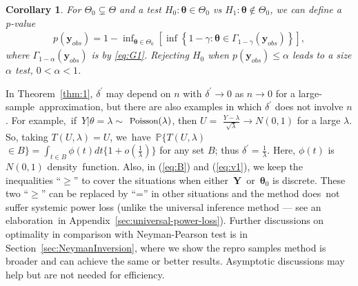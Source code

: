 \documentclass[12pt]{article}
\theoremstyle{shortspace}
\newtheorem{corollary}{Corollary}
\def\*#1{\bm{#1}}
\def\P{\mathbb P}
\begin{document}
\begin{corollary}\label{col:test}
For $\Theta_0 \subsetneq \Theta$ and 
a test $H_0: \*\theta \in \Theta_0$ vs $H_1: \*\theta \not\in \Theta_0$, we can define a p-value 
\begin{align*} 
p(\*y_{obs})=   1- \inf\nolimits_{\*\theta \in \Theta_0}\left[\inf\left\{{1- \gamma}: 
\*\theta \in \Gamma_{1 - \gamma}
(\*y_{obs})\right\}\right],
\end{align*}
where $\Gamma_{1-\alpha}(\*y_{obs})$ is by  \eqref{eq:G1}.
Rejecting $H_0$ when
$p(\*y_{obs}) \leq \alpha$ 
leads to a size $\alpha$ test, $0 < \alpha < 1$. 
\end{corollary}

In Theorem~\ref{thm:1},
 $\delta^{'}$ 
 may depend  on $n$ with $\delta^{'} \to 0$ as $n \to 0$ for a large-sample~approximation, but there are also examples in which $\delta^{'}$ does not involve $n$.
For example,~if~$Y | \theta  = \lambda \sim $ $  \text{\small Poisson}(\lambda)$, then 
$U =$ $ \frac{Y -  \lambda}{\sqrt{\lambda}}
\to N(0,1)$ for a large $\lambda$. So, 
taking $T(U, \lambda) = U$, we~have~$\P \{T(U,  \lambda) $ $ \in B \} =  \int_{{t} \in B}
\phi({t}) d {t} \{1 + o(\frac1\lambda)\}$ for any set $B$; thus $\delta^{'} = \frac1\lambda$. 
Here, 
 $\phi(t)$ is $N(0,1)$ density~function. Also, in (\ref{eq:B}) and (\ref{eq:v1}), 
we keep 
the inequalities ``$\geq$'' to cover the situations when either~$\*Y$~or~$\*\theta_0$ is discrete. These two ``$\geq$'' can be replaced by
 ``='' in other situations and the method does~not suffer systemic power loss (unlike the universal inference method --- see an elaboration~in Appendix~\ref{sec:universal-power-loss}).  
 Further discussions on optimality in comparison with Neyman-Pearson test is in Section~\ref{sec:NeymanInversion}, where we show the repro samples method is broader and 
 can achieve the same or better results. Asymptotic discussions may help but are not needed for efficiency. 
 
\end{document}
